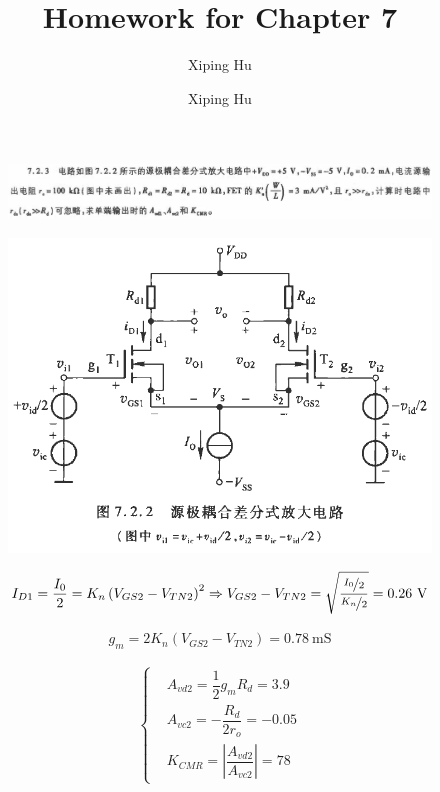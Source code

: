 \documentclass{article}
\author{Xiping Hu}
\author{Xiping Hu}
\affil{https://hxp.plus/}
\title{Homework for Chapter 7}
\renewcommand{\frac}{\nicefrac}
\begin{document}
\maketitle

\begin{figure}[H]
  \centering
  \includegraphics[width=\linewidth]{figures/Problem723} 
  \label{fig:}
\end{figure}

\begin{figure}[H]
  \centering
  \includegraphics[width=0.7\linewidth]{figures/Problem7231} 
  \label{fig:}
\end{figure}

\begin{equation*}
  \begin{aligned}
    I_{D1} = \dfrac{I_0}{2} = K_n \left( V_{GS2} - V_{TN2} \right)^2 \Rightarrow V_{GS2} - V_{TN2} = \sqrt{\dfrac{\frac{I_0}{2} }{\frac{K_n}{2} } } = 0.26 \  \mathrm{V}
  \end{aligned}
\end{equation*}

\begin{equation*}
  \begin{aligned}
    g_m = 2 K_n \left( V_{GS2} - V_{TN2} \right) = 0.78 \  \mathrm{mS}
  \end{aligned}
\end{equation*}

\begin{equation*}
  \left\{
    \begin{aligned}
      & A_{vd2} = \dfrac{1}{2} g_m R_d = 3.9 \\
      & A_{vc2} = - \dfrac{R_d}{2 r_o} = - 0.05 \\
      & K_{CMR} = \left| \dfrac{A_{vd2}}{A_{vc2}}  \right| = 78
    \end{aligned}
  \right.
\end{equation*}
\end{document}
